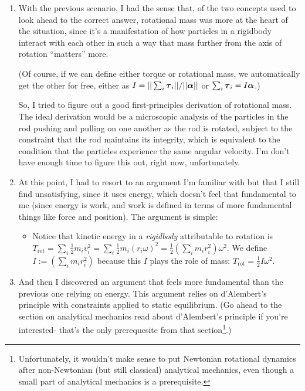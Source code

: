 \documentclass{article}
\begin{document}
\begin{enumerate}
    \item With the previous scenario, I had the sense that, of the two concepts used to look ahead to the correct answer, rotational mass was more at the heart of the situation, since it's a manifestation of how particles in a rigidbody interact with each other in such a way that mass further from the axis of rotation ``matters'' more.

    (Of course, if we can define either torque or rotational mass, we automatically get the other for free, either as $I = ||\sum_i \boldsymbol{\tau}_i||/||\boldsymbol{\alpha}||$ or $\sum_i \boldsymbol{\tau}_i = I \boldsymbol{\alpha}$.)

    So, I tried to figure out a good first-principles derivation of rotational mass. The ideal derivation would be a microscopic analysis of the particles in the rod pushing and pulling on one another as the rod is rotated, subject to the constraint that the rod maintains its integrity, which is equivalent to the condition that the particles experience the same angular velocity. I'm don't have enough time to figure this out, right now, unfortunately.

    \item At this point, I had to resort to an argument I'm familiar with but that I still find unsatisfying, since it uses energy, which doesn't feel that fundamental to me (since energy is work, and work is defined in terms of more fundamental things like force and position). The argument is simple:
    \begin{itemize}
        \item Notice that kinetic energy in a \textit{rigidbody} attributable to rotation is $T_{\text{rot}} = \sum_i \frac{1}{2} m_i v_i^2 = \sum_i \frac{1}{2} m_i (r_i \omega)^2 = \frac{1}{2} (\sum_i m_i r_i^2) \omega^2$. We define $I := (\sum_i m_i r_i^2)$ because this $I$ plays the role of mass: $T_{\text{rot}} = \frac{1}{2}I \omega^2$.
    \end{itemize}

    \item And then I discovered an argument that feels more fundamental than the previous one relying on energy. This argument relies on d'Alembert's principle with constraints applied to static equilibrium. (Go ahead to the section on analytical mechanics read about d'Alembert's principle if you're interested- that's the only prerequesite from that section\footnote{Unfortunately, it wouldn't make sense to put Newtonian rotational dynamics after non-Newtonian (but still classical) analytical mechanics, even though a small part of analytical mechanics is a prerequisite.}.)


\end{enumerate}
\end{document}
